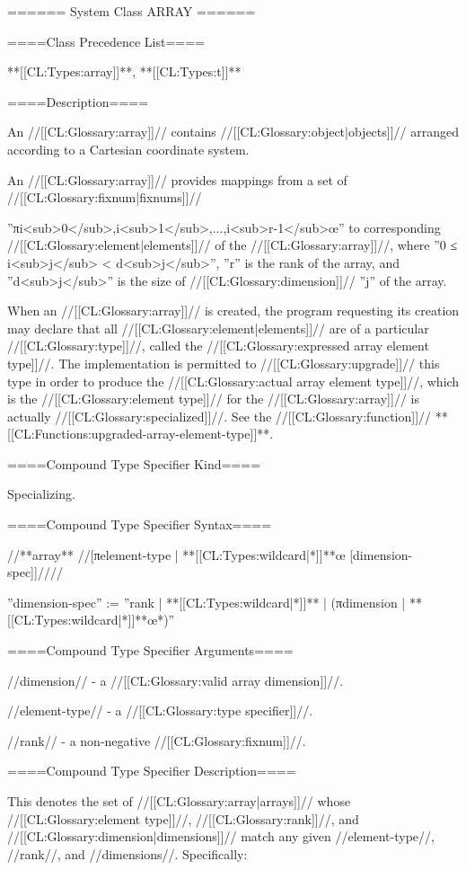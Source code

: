 ====== System Class ARRAY ======

====Class Precedence List====

**[[CL:Types:array]]**, **[[CL:Types:t]]**

====Description====

An //[[CL:Glossary:array]]// contains //[[CL:Glossary:object|objects]]// arranged according to a Cartesian coordinate system.

An //[[CL:Glossary:array]]// provides mappings from a set of //[[CL:Glossary:fixnum|fixnums]]//

''πi<sub>0</sub>,i<sub>1</sub>,...,i<sub>r-1</sub>œ'' to corresponding //[[CL:Glossary:element|elements]]// of the //[[CL:Glossary:array]]//, where ''0 ≤ i<sub>j</sub> < d<sub>j</sub>'', ''r'' is the rank of the array, and ''d<sub>j</sub>'' is the size of //[[CL:Glossary:dimension]]// ''j'' of the array.

When an //[[CL:Glossary:array]]// is created, the program requesting its creation may declare that all //[[CL:Glossary:element|elements]]// are of a particular //[[CL:Glossary:type]]//, called the //[[CL:Glossary:expressed array element type]]//. The implementation is permitted to //[[CL:Glossary:upgrade]]// this type in order to produce the //[[CL:Glossary:actual array element type]]//, which is the //[[CL:Glossary:element type]]// for the //[[CL:Glossary:array]]// is actually //[[CL:Glossary:specialized]]//. See the //[[CL:Glossary:function]]// **[[CL:Functions:upgraded-array-element-type]]**.

====Compound Type Specifier Kind====

Specializing.

====Compound Type Specifier Syntax====

//**array** //[πelement-type | **[[CL:Types:wildcard|*]]**œ [dimension-spec]]////

''dimension-spec'' := ''rank | **[[CL:Types:wildcard|*]]** | (πdimension | **[[CL:Types:wildcard|*]]**œ*)''

====Compound Type Specifier Arguments====

//dimension// - a //[[CL:Glossary:valid array dimension]]//.

//element-type// - a //[[CL:Glossary:type specifier]]//.

//rank// - a non-negative //[[CL:Glossary:fixnum]]//.

====Compound Type Specifier Description====

This denotes the set of //[[CL:Glossary:array|arrays]]// whose //[[CL:Glossary:element type]]//, //[[CL:Glossary:rank]]//, and //[[CL:Glossary:dimension|dimensions]]// match any given //element-type//, //rank//, and //dimensions//. Specifically:

